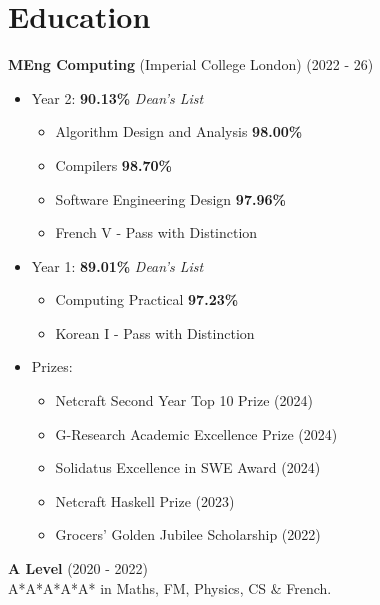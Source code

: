 \documentclass{Resume}
\begin{document}







	\section{Education}
	\textbf{MEng Computing} (Imperial College London) \hfill (2022 - 26)
 \begin{itemize}
     \item Year 2: \textbf{90.13\%} \textit{Dean's List} \begin{itemize}
         \item Algorithm Design and Analysis \textbf{98.00\%}
         \item Compilers \textbf{98.70\%}
         \item Software Engineering Design \textbf{97.96\%}
         \item French V - Pass with Distinction
     \end{itemize}
     \item Year 1: \textbf{89.01\%} \textit{Dean's List} \begin{itemize}
         \item Computing Practical \textbf{97.23\%}
         \item Korean I - Pass with Distinction
     \end{itemize}
     \item Prizes: \begin{itemize}
         \item Netcraft Second Year Top 10 Prize (2024)
         \item G-Research Academic Excellence Prize (2024)
         \item Solidatus Excellence in SWE Award (2024)
         \item Netcraft Haskell Prize (2023)
         \item Grocers' Golden Jubilee Scholarship (2022)
     \end{itemize}
 \end{itemize}
		\textbf{A Level} \hfill (2020 - 2022) \\
                A*A*A*A*A* in Maths, FM, Physics, CS \& French.
            
\end{document}
